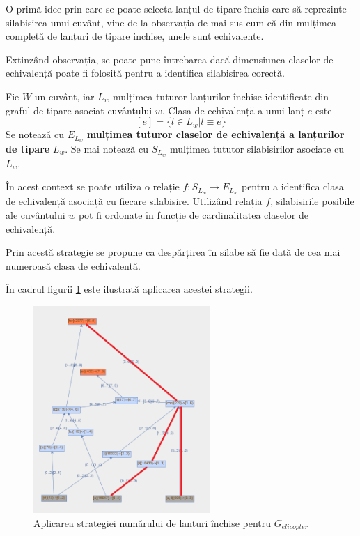O primă idee prin care se poate selecta lanțul de tipare închis care să reprezinte silabisirea unui cuvânt, vine de la observația de mai sus cum că din mulțimea completă de lanțuri de tipare inchise, unele sunt echivalente. 

Extinzând observația, se poate pune întrebarea dacă dimensiunea claselor de echivalență poate fi folosită pentru a identifica silabisirea corectă. 

\begin{defi}
Fie $W$ un cuvânt, iar $L_w$ mulțimea tuturor lanțurilor închise identificate din graful de tipare asociat cuvântului $w$. Clasa de echivalență a unui lanț $e$ este 
\begin{equation}
\left[e\right] = \{l \in L_w \vert l \equiv e\}
\end{equation}
Se notează cu $E_{L_w}$\textbf{ mulțimea tuturor claselor de echivalență a lanțurilor de tipare} $L_w$. Se mai notează cu $S_{L_w}$ mulțimea tututor silabisirilor asociate cu $L_w$. 
\end{defi}

În acest context se poate utiliza o relație $f: S_{L_w} \rightarrow E_{L_w}$ pentru a identifica clasa de echivalență asociață cu fiecare silabisire. Utilizând relația $f$, silabisirile posibile ale cuvântului $w$ pot fi ordonate în funcție de cardinalitatea claselor de echivalență. 

Prin acestă strategie se propune ca despărțirea în silabe să fie dată de cea mai numeroasă clasa de echivalentă.

\begin{ex}
În cadrul figurii \ref{fig:rosil-counting} este ilustrată aplicarea acestei strategii. 
\end{ex}

\begin{figure}[h!]
    \centering
    \includegraphics[width=0.6\textwidth]{figures/rosil-counting.png}
    \caption{Aplicarea strategiei numărului de lanțuri închise pentru $G_{elicopter}$}
    \label{fig:rosil-counting}
\end{figure}

